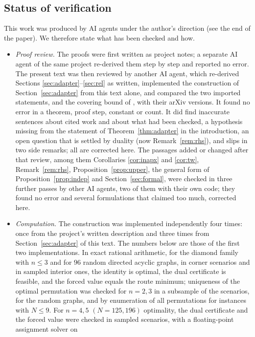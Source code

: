 \documentclass[11pt]{amsart}
\theoremstyle{plain}
\theoremstyle{definition}
\theoremstyle{remark}
\begin{document}
\subsection*{Status of verification}
This work was produced by AI agents under the author's direction (see the end of the paper). We therefore state what
has been checked and how.
\begin{itemize}
\item \emph{Proof review.} The proofs were first written as project notes; a separate AI agent of the same project
  re-derived them step by step and reported no error. The present text was then reviewed by another AI agent, which
  re-derived Sections \ref{sec:adapter}--\ref{sec:rel} as written, implemented the construction of
  Section~\ref{sec:adapter} from this text alone, and compared the two imported statements, \cite[Lemma~4]{BFPS}
  and the covering bound of \cite{KW}, with their arXiv versions. It found no error in a theorem, proof step,
  constant or count. It did find inaccurate sentences about cited work and about what had been checked, a hypothesis
  missing from the statement of Theorem~\ref{thm:adapter} in the introduction, an open question that is settled by
  duality (now Remark~\ref{rem:rhs}), and slips in two side remarks; all are corrected here. The passages added or changed after that review, among them Corollaries \ref{cor:inapx} and \ref{cor:tw}, Remark~\ref{rem:rhs}, Proposition~\ref{prop:upper}, the general form of Proposition~\ref{prop:indep} and Section~\ref{sec:formal}, were checked in three further passes by other AI agents, two of them with their own code; they found no error and several formulations that claimed too much, corrected here.
\item \emph{Computation.} The construction was implemented independently four times: once from the project's
  written description and three times from Section~\ref{sec:adapter} of this text. The numbers below are those of
  the first two implementations. In exact rational arithmetic, for the diamond family
  with $n\le3$ and for $96$ random directed acyclic graphs, in corner scenarios and in sampled interior ones, the
  identity is optimal, the dual certificate is feasible, and the forced value equals the route minimum; uniqueness
  of the optimal permutation was checked for $n=2,3$ in a subsample of the scenarios, for the random graphs, and by
  enumeration of all permutations for instances with $N\le9$. For $n=4,5$ $(N=125,196)$ optimality, the dual
  certificate and the forced value were checked in sampled scenarios, with a floating-point assignment solver on

\end{itemize}
\end{document}
